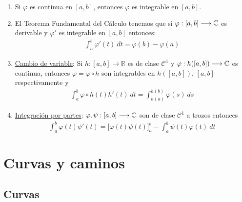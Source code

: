 \begin{obs}
\begin{enumerate}
\begin{proof}
\begin{itemize}
\begin{align*}
                                                                             & = \int_{a}^{b}{\re(e^{-i\theta}\varphi(t)) \ dt} \leq \int_{a}^{b}{\left|\re(e^{-i\theta}\varphi(t))\right| \ dt} \\
                                                                             & = \int_{a}^{b}{|\varphi(t)| \ dt}
                            \end{align*}
                  \end{itemize}
              \end{proof}
        \item Si $\varphi$ es continua en $[a,b]$, entonces $\varphi$ es integrable en $[a,b]$.
        \item El Teorema Fundamental del Cálculo tenemos que si $\varphi : [a,b] \longrightarrow \mathbb{C}$ es derivable y $\varphi'$ es integrable en $[a,b]$ entonces:
              \begin{align*}
                  \int_{a}^{b}{\varphi'(t) \ dt} = \varphi(b) - \varphi(a)
              \end{align*}
        \item \underline{Cambio de variable}: Si $h :[a,b] \longrightarrow \mathbb{R}$ es de clase $\mathcal{C}^1$ y $\varphi : h([a,b]) \longrightarrow \mathbb{C}$ es continua, entonces $\varphi = \varphi \circ h$ son integrables en $h([a,b])$, $[a,b]$ respectivamente y
              \begin{align*}
                  \int_{a}^{b}{\varphi \circ h(t)h'(t) \ dt} = \int_{h(a)}^{h(b)}{\varphi(s) \ ds}
              \end{align*}
        \item \underline{Integración por partes}: $\varphi, \psi : [a,b] \longrightarrow \mathbb{C}$ son de clase $\mathcal{C}^1$ a trozos entonces
              \begin{align*}
                  \int_{a}^{b}{\varphi(t)\psi'(t)} = \Big[ \varphi(t)\psi(t)\Big]_a^b - \int_{a}^{b}{\psi(t)\varphi(t) \ dt}
              \end{align*}
    \end{enumerate}
\end{obs}

\section{Curvas y caminos}

\subsection{Curvas}

